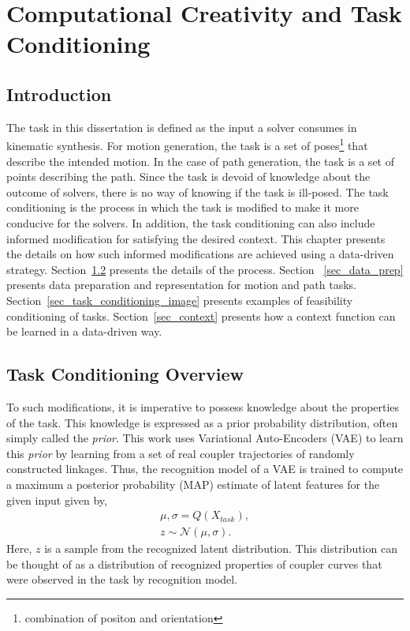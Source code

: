 \chapter{Computational Creativity and Task Conditioning}\label{ch-task-conditioning}
\section{Introduction}

The task in this dissertation is defined as the input a solver consumes in kinematic synthesis. For motion generation, the task is a set of poses\footnote{combination of positon and orientation} that describe the intended motion. In the case of path generation, the task is a set of points describing the path. Since the task is devoid of knowledge about the outcome of solvers, there is no way of knowing if the task is ill-posed. The task conditioning is the process in which the task is modified to make it more conducive for the solvers. In addition, the task conditioning can also include informed modification for satisfying the desired context. This chapter presents the details on how such informed modifications are achieved using a data-driven strategy. Section~\ref{sec_task_conditioning_overview} presents the details of the process. Section ~\ref{sec_data_prep} presents data preparation and representation for motion and path tasks. Section~\ref{sec_task_conditioning_image} presents examples of feasibility conditioning of tasks. Section~\ref{sec_context} presents how a context function can be learned in a data-driven way.    
\section{Task Conditioning Overview}\label{sec_task_conditioning_overview}
To such modifications, it is imperative to possess knowledge about the properties of the task. This knowledge is expressed as a prior probability distribution, often simply called the \emph{prior}. This work uses Variational Auto-Encoders (VAE) to learn this \emph{prior} by learning from a set of real coupler trajectories of randomly constructed linkages. Thus, the recognition model of a VAE is trained to compute a maximum a posterior probability (MAP) estimate of latent features for the given input given by,
\begin{eqnarray}
  \mu, \sigma = Q(X_{task}), \\
  z \sim \mathcal{N}(\mu, \sigma).
\end{eqnarray}
Here, $z$ is a sample from the recognized latent distribution. This distribution can be thought of as a distribution of recognized properties of coupler curves that were observed in the task by recognition model.  

